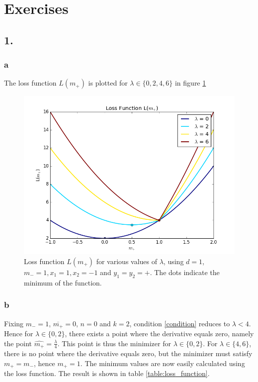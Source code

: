 \documentclass [a4paper] {report}
\begin{document}
	{\let\clearpage\relax\chapter*{Exercises}}
	
	\section*{1.}
	\subsection*{a}
	The loss function $L(m_{+})$ is plotted for $\lambda \in \{0,2,4,6\}$ in figure \ref{fig:loss1}
	\begin{figure}[H]
		\includegraphics[scale=0.7]{Images/loss_function1.png}
		\caption{Loss function $L(m_{+})$ for various values of $\lambda$, using $d=1$, $m_{-}=1, x_{1} = 1, x_{2} = -1$ and $y_{1} = y_{2} = +$. The dots indicate the minimum of the function.}
		\label{fig:loss1}
	\end{figure}
	
	\subsection*{b}
	Fixing $m_{-}=1$, $\overline{m_{+}} = 0$, $n=0$ and $k=2$, condition \ref{condition} reduces to $\lambda<4$. Hence for $\lambda \in \{0,2\}$, there exists a point where the derivative equals zero, namely the point $\hat{m_{+}}=\frac{\lambda}{4}$. This point is thus the minimizer for $\lambda \in \{0,2\}$. For $\lambda \in \{4,6\}$, there is no point where the derivative equals zero, but the minimizer must satisfy $m_{+} = m_{-}$, hence $m_{+} = 1$. The minimum values are now easily calculated using the loss function. The result is shown in table \ref{table:loss_function}.
	
\end{document}
